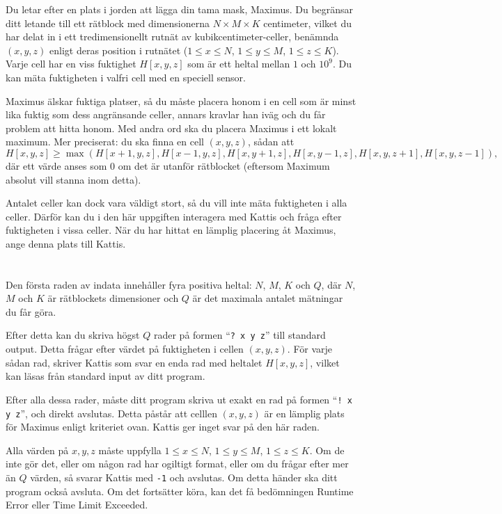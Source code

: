 \ifx\boi\undefined\fi
\def\version{jury-1}

Du letar efter en plats i jorden att lägga din tama mask, Maximus. Du begränsar ditt letande till ett rätblock med dimensionerna $N \times M \times K$ centimeter, vilket du har delat in i ett tredimensionellt rutnät av kubikcentimeter-celler, benämnda $(x,y,z)$ enligt deras position i rutnätet ($1 \le x \le N$, $1 \le y \le M$, $1 \le z \le K$). Varje cell har en viss fuktighet $H[x,y,z]$ som är ett heltal mellan $1$ och $10^9$. Du kan mäta fuktigheten i valfri cell med en speciell sensor.

Maximus älskar fuktiga platser, så du måste placera honom i en cell som är minst lika fuktig som dess angränsande celler, annars kravlar han iväg och du får problem att hitta honom. Med andra ord ska du placera Maximus i ett lokalt maximum.
Mer preciserat: du ska finna en cell $(x,y,z)$, sådan att
$$
H[x,y,z] \ge \max(H[x+1,y,z], H[x-1,y,z], H[x,y+1,z], H[x,y-1,z], H[x,y,z+1], H[x,y,z-1]),
$$
där ett värde anses som $0$ om det är utanför rätblocket (eftersom Maximum absolut vill stanna inom detta).

Antalet celler kan dock vara väldigt stort, så du vill inte mäta fuktigheten i alla celler. Därför kan du i den här uppgiften interagera med Kattis och fråga efter fuktigheten i vissa celler. När du har hittat en lämplig placering åt Maximus, ange denna plats till Kattis.

\section*{\interactivity}
Den första raden av indata innehåller fyra positiva heltal: $N$, $M$, $K$ och $Q$, där $N$, $M$ och $K$ är rätblockets dimensioner och $Q$ är det maximala antalet mätningar du får göra.

Efter detta kan du skriva högst $Q$ rader på formen ``\texttt{?\ x y z}'' till standard output.
Detta frågar efter värdet på fuktigheten i cellen  $(x, y, z)$.
För varje sådan rad, skriver Kattis som svar en enda rad med heltalet $H[x,y,z]$, vilket kan läsas från standard input av ditt program.

Efter alla dessa rader, måste ditt program skriva ut exakt en rad på formen ``\texttt{!\ x y z}'', och direkt avslutas.
Detta påstår att celllen $(x, y, z)$ är en lämplig plats för Maximus enligt kriteriet ovan. Kattis ger inget svar på den här raden.

Alla värden på $x, y, z$ måste uppfylla $1 \le x \le N$, $1 \le y \le M$, $1 \le z \le K$.
Om de inte gör det, eller om någon rad har ogiltigt format, eller om du frågar efter mer än $Q$ värden,
så svarar Kattis med \texttt{-1} och avslutas. 
Om detta händer ska ditt program också avsluta. Om det fortsätter köra, kan det få bedömningen Runtime Error eller Time Limit Exceeded.

